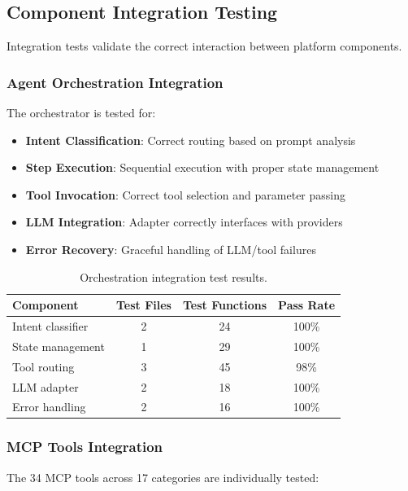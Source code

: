\subsection{Component Integration Testing}

Integration tests validate the correct interaction between platform components.

\subsubsection{Agent Orchestration Integration}

The orchestrator is tested for:

\begin{itemize}
    \item \textbf{Intent Classification}: Correct routing based on prompt analysis
    \item \textbf{Step Execution}: Sequential execution with proper state management
    \item \textbf{Tool Invocation}: Correct tool selection and parameter passing
    \item \textbf{LLM Integration}: Adapter correctly interfaces with providers
    \item \textbf{Error Recovery}: Graceful handling of LLM/tool failures
\end{itemize}

\begin{table}[ht]
\centering
\caption{Orchestration integration test results.}
\label{tab:orchestration-integration}
\small
\begin{tabular}{lccc}
\hline
\textbf{Component} & \textbf{Test Files} & \textbf{Test Functions} & \textbf{Pass Rate} \\
\hline
Intent classifier & 2 & 24 & 100\% \\
State management & 1 & 29 & 100\% \\
Tool routing & 3 & 45 & 98\% \\
LLM adapter & 2 & 18 & 100\% \\
Error handling & 2 & 16 & 100\% \\
\hline
\end{tabular}
\end{table}

\subsubsection{MCP Tools Integration}

The 34 MCP tools across 17 categories are individually tested:


